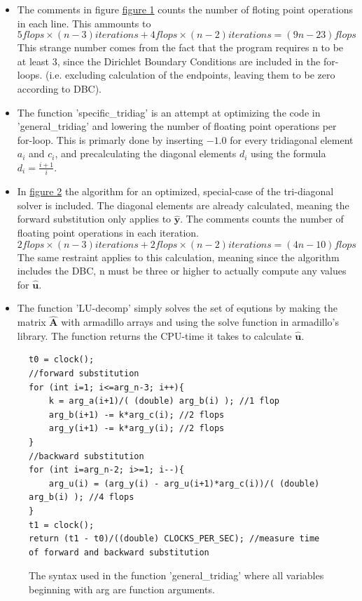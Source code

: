 \documentclass[11pt,a4paper,notitlepage]{article}
\begin{document}
\begin{itemize}
\item The comments in figure \hyperref[code:general_syntax]{figure 1} counts the number of floting point operations in each line. This ammounts to $$5 flops\times(n-3)iterations + 4 flops \times (n-2)iterations = (9n - 23) flops $$ This strange number comes from the fact that the program requires n to be at least 3, since the Dirichlet Boundary Conditions are included in the for-loops. (i.e. excluding calculation of the endpoints, leaving them to be zero according to DBC).

\item The function 'specific\_tridiag' is an attempt at optimizing the code in 'general\_tridiag' and lowering the  number of floating point operations per for-loop. This is primarly done by inserting $-1.0$ for every tridiagonal element $a_i$ and $c_i$, and precalculating the diagonal elements $d_i$ using the formula $d_i = \frac{i+1}{i}$.

\item In \hyperref[code:specific_syntax]{figure 2} the algorithm for an optimized, special-case of the tri-diagonal solver is included. The diagonal elements are already calculated, meaning the forward substitution only applies to $\mathbf{\hat{y}}$. The comments counts the number of floating point operations in each iteration. $$ 2flops\times(n-3)iterations + 2flops\times(n-2)iterations = (4n - 10)flops$$ The same restraint applies to this calculation, meaning since the algorithm includes the DBC, n must be three or higher to actually compute any values for $\mathbf{\hat{u}}$.

\item The function 'LU-decomp' simply solves the set of equtions by making the matrix $\mathbf{\hat{A}}$ with armadillo arrays and using the solve function in armadillo's library. The function returns the CPU-time it takes to calculate $\mathbf{\hat{u}}$.
\end{itemize}

\begin{figure}[H]
\label{code:general_syntax}
\lstset{style=c++style}
\begin{lstlisting}[frame=single]
t0 = clock();
//forward substitution
for (int i=1; i<=arg_n-3; i++){
    k = arg_a(i+1)/( (double) arg_b(i) ); //1 flop
    arg_b(i+1) -= k*arg_c(i); //2 flops
    arg_y(i+1) -= k*arg_y(i); //2 flops
}
//backward substitution
for (int i=arg_n-2; i>=1; i--){
  	arg_u(i) = (arg_y(i) - arg_u(i+1)*arg_c(i))/( (double) arg_b(i) ); //4 flops
}
t1 = clock();
return (t1 - t0)/((double) CLOCKS_PER_SEC); //measure time of forward and backward substitution
\end{lstlisting}
\caption{The syntax used in the function 'general\_tridiag' where all variables beginning with arg are function arguments.}
\end{figure}
	
\end{document}
